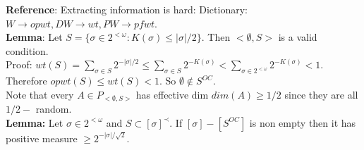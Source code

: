\documentclass{article}
\begin{document}
   \textbf{Reference}: Extracting information is hard: Dictionary: $W \to opwt, DW \to wt, PW \to pfwt$.\\
   \textbf{Lemma}: Let $S = \{\sigma \in 2^{<\omega} : K(\sigma) \leq |\sigma| / 2\}$. Then $<\emptyset, S > $ is a valid condition. \\
   Proof: $wt(S) = \sum_{\sigma \in S} 2^{-|\sigma|/2} \leq \sum_{\sigma \in S} 2^{-K(\sigma)} < \sum_{\sigma \in 2^{<\omega}} 2^{-K(\sigma) } < 1$. Therefore $opwt(S) \leq wt(S) < 1$. So $\emptyset \not \in S^{OC}$. \\
   Note that every $A \in P_{<\emptyset, S>}$ has effective dim $dim(A) \geq 1/2$ since they are all $1/2- $ random.
   \\ \textbf{Lemma: } Let $\sigma \in 2^{<\omega}$ and $S \subset [\sigma]^\prec$. If $[\sigma] - [S^{OC}]$ is non empty then it has positive measure $\geq 2^{-|\sigma|/\sqrt 2}$.
   \newpage
\end{document}
